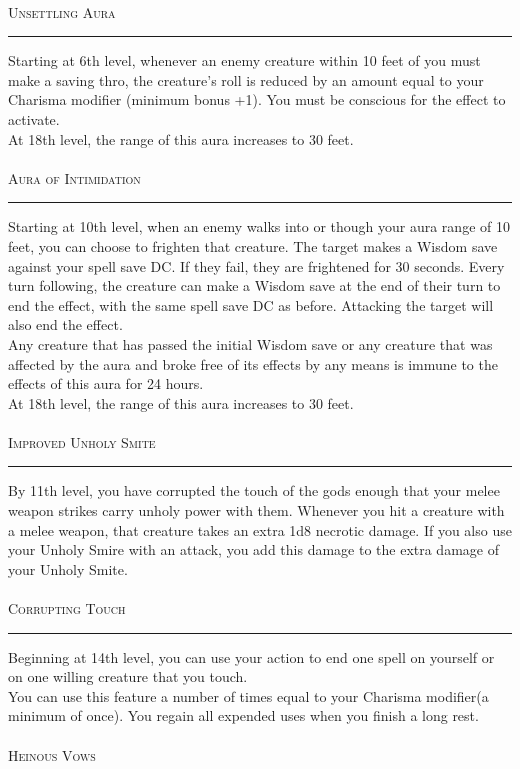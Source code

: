 \documentclass[22pt,a4paper]{article}
\newcommand{\HRule}[2]{\par
  \vspace*{\dimexpr-\parskip-\baselineskip+#2}
  \begingroup
  	\color{sepcol}
  	\noindent\rule{\linewidth}{#1}\par
  \endgroup  
  \vspace*{\dimexpr-\parskip-.5\baselineskip+#2}}
\begin{document}
\begin{multicols*}{2}
\\
{\fontsize{14pt}{14pt}\textcolor{title}{\textsc{Unsettling Aura}}}
\HRule{1pt}{8pt}
Starting at 6th level, whenever an enemy creature within 10 feet of you must make a saving thro, the creature's roll is reduced by an amount equal to your Charisma modifier (minimum bonus +1). You must be conscious for the effect to activate.\\
\indent At 18th level, the range of this aura increases to 30 feet.\\
\\
{\fontsize{14pt}{14pt}\textcolor{title}{\textsc{Aura of Intimidation}}}
\HRule{1pt}{8pt}
Starting at 10th level, when an enemy walks into or though your aura range of 10 feet, you can choose to frighten that creature. The target makes a Wisdom save against your spell save DC. If they fail, they are frightened for 30 seconds. Every turn following, the creature can make a Wisdom save at the end of their turn to end the effect, with the same spell save DC as before. Attacking the target will also end the effect.\\
\indent Any creature that has passed the initial Wisdom save or any creature that was affected by the aura and broke free of its effects by any means is immune to the effects of this aura for 24 hours.\\
\indent At 18th level, the range of this aura increases to 30 feet.\\
\\
{\fontsize{14pt}{14pt}\textcolor{title}{\textsc{Improved Unholy Smite}}}
\HRule{1pt}{8pt}
By 11th level, you have corrupted the touch of the gods enough that your melee weapon strikes carry unholy power with them. Whenever you hit a creature with a melee weapon, that creature takes an extra 1d8 necrotic damage. If you also use your Unholy Smire with an attack, you add this damage to the extra damage of your Unholy Smite.\\
\\
{\fontsize{14pt}{14pt}\textcolor{title}{\textsc{Corrupting Touch}}}
\HRule{1pt}{8pt}
Beginning at 14th level, you can use your action to end one spell on yourself or on one willing creature that you touch.\\
\indent You can use this feature a number of times equal to your Charisma modifier(a minimum of once). You regain all expended uses when you finish a long rest.\\
\\
{\fontsize{18pt}{18pt}\textcolor{title}{\textsc{Heinous Vows}}}\\

\end{multicols*}
\end{document}
